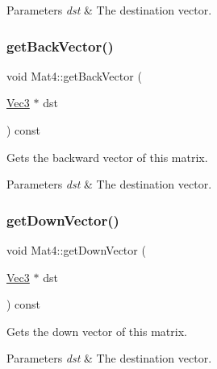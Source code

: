 \begin{DoxyParams}{Parameters}
{\em dst} & The destination vector. \\
\hline
\end{DoxyParams}
\mbox{\label{classMat4_aa1f197b8d1e34ebf41bf7c222119b11b}} 
\subsubsection{\texorpdfstring{get\+Back\+Vector()}{getBackVector()}\hspace{0.1cm}{\footnotesize\ttfamily [2/2]}}
{\footnotesize\ttfamily void Mat4\+::get\+Back\+Vector (\begin{DoxyParamCaption}\item[{\hyperlink{classVec3}{Vec3} $\ast$}]{dst }\end{DoxyParamCaption}) const}

Gets the backward vector of this matrix.


\begin{DoxyParams}{Parameters}
{\em dst} & The destination vector. \\
\hline
\end{DoxyParams}
\mbox{\label{classMat4_a2219e0177bc699742b7f0531b10a8054}} 
\subsubsection{\texorpdfstring{get\+Down\+Vector()}{getDownVector()}\hspace{0.1cm}{\footnotesize\ttfamily [1/2]}}
{\footnotesize\ttfamily void Mat4\+::get\+Down\+Vector (\begin{DoxyParamCaption}\item[{\hyperlink{classVec3}{Vec3} $\ast$}]{dst }\end{DoxyParamCaption}) const}

Gets the down vector of this matrix.


\begin{DoxyParams}{Parameters}
{\em dst} & The destination vector. \\
\hline
\end{DoxyParams}
\mbox{\label{classMat4_a2219e0177bc699742b7f0531b10a8054}} 
